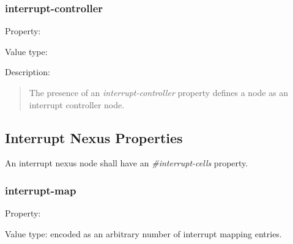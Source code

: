 \documentclass[a4paper,10pt,oneside]{sphinxmanual}
\begin{document}
\subsubsection{interrupt-controller}
\label{devicetree-basics:interrupt-controller}
Property: 

Value type: 

Description:
\begin{quote}

The presence of an \emph{interrupt-controller} property defines a node as an
interrupt controller node.
\end{quote}


\subsection{Interrupt Nexus Properties}
\label{devicetree-basics:interrupt-nexus-properties}
An interrupt nexus node shall have an \emph{\#interrupt-cells} property.


\subsubsection{interrupt-map}
\label{devicetree-basics:interrupt-map}
Property: 

Value type:  encoded as an arbitrary number of
interrupt mapping entries.
\end{document}

